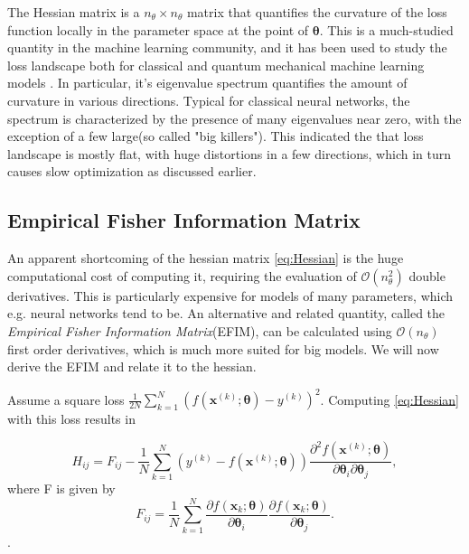 The Hessian matrix is a $n_\theta \times n_\theta$ matrix that quantifies the curvature of the loss function locally in the parameter space at the point of $\boldsymbol{\theta}$. This is a much-studied quantity in the machine learning community, and it has been used to study the loss landscape both for classical and quantum mechanical machine learning models \cite{LeCun2012} \cite{Huembeli_2021}. In particular, it's eigenvalue spectrum quantifies the amount of curvature in various directions. Typical for classical neural networks, the spectrum is characterized by the presence of many eigenvalues near zero, with the exception of a few large(so called "big killers"). This indicated the that loss landscape is mostly flat, with huge distortions in a few directions, which in turn causes slow optimization as discussed earlier. 

\subsection{Empirical Fisher Information Matrix}\label{sec:EFIM}
An apparent shortcoming of the hessian matrix \autoref{eq:Hessian} is the huge computational cost of computing it, requiring the evaluation of $\mathcal{O}(n_\theta^2)$ double derivatives. This is particularly expensive for models of many parameters, which e.g. neural networks tend to be. An alternative and related quantity, called the \emph{Empirical Fisher Information Matrix}(EFIM), can be calculated using $\mathcal{O}(n_\theta)$ first order derivatives, which is much more suited for big models. We will now derive the EFIM and relate it to the hessian.

Assume a square loss $\frac{1}{2N}\sum_{k=1}^{N} (f(\boldsymbol{x}^{(k)}; \boldsymbol{\theta}) - y^{(k)})^2$. Computing \autoref{eq:Hessian} with this loss results in 
    
\begin{equation}\label{eq:HessianSquareLoss}
    H_{ij} = F_{ij} -
    \frac{1}{N}\sum_{k=1}^{N} (y^{(k)} - f(\boldsymbol{x}^{(k)};\boldsymbol{\theta}))\frac{\partial^2 f(\boldsymbol{x}^{(k)};\boldsymbol{\theta})}{\partial \boldsymbol{\theta}_i\partial \boldsymbol{\theta}_j}, 
\end{equation}
where F is given by
\begin{equation}
\label{eq:EmpiricalFisher}
    F_{ij} =  \frac{1}{N}\sum_{k=1}^{N}
    \frac{\partial f(\boldsymbol{x}_k;\boldsymbol{\theta})}{\partial \boldsymbol{\theta}_i}
    \frac{\partial f(\boldsymbol{x}_k;\boldsymbol{\theta})}{\partial \boldsymbol{\theta}_j}.
\end{equation}.

